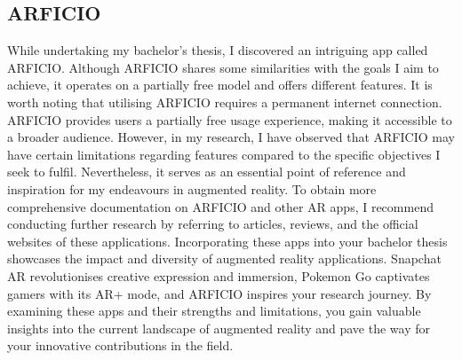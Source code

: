 \subsection*{ARFICIO}
While undertaking my bachelor's thesis, I discovered an intriguing app called ARFICIO. Although ARFICIO shares some similarities with the goals I aim to achieve, it operates on a partially free model and offers different features. It is worth noting that utilising ARFICIO requires a permanent internet connection.
ARFICIO provides users a partially free usage experience, making it accessible to a broader audience. However, in my research, I have observed that ARFICIO may have certain limitations regarding features compared to the specific objectives I seek to fulfil. Nevertheless, it serves as an essential point of reference and inspiration for my endeavours in augmented reality.
To obtain more comprehensive documentation on ARFICIO and other AR apps, I recommend conducting further research by referring to articles, reviews, and the official websites of these applications.
Incorporating these apps into your bachelor thesis showcases the impact and diversity of augmented reality applications. Snapchat AR revolutionises creative expression and immersion, Pokemon Go captivates gamers with its AR+ mode, and ARFICIO inspires your research journey. By examining these apps and their strengths and limitations, you gain valuable insights into the current landscape of augmented reality and pave the way for your innovative contributions in the field.
